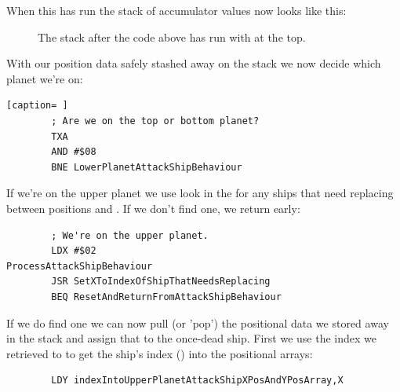 When this has run the stack of accumulator values now looks like this:

\begin{figure}[H]
  {
    \setlength{\tabcolsep}{3.0pt}
    \setlength\cmidrulewidth{\heavyrulewidth} %
    \begin{adjustbox}{width=10cm,center}
    \end{adjustbox}

  }\caption*{The stack after the code above has run with  at the top.}
\end{figure}

With our position data safely stashed away on the stack we now decide which planet we're on:

\begin{lstlisting}[caption= ]
        ; Are we on the top or bottom planet?
        TXA
        AND #$08
        BNE LowerPlanetAttackShipBehaviour
\end{lstlisting}

If we're on the upper planet we use  look in the  for any ships that
need replacing between positions  and . If we don't find one, we return early:

\begin{lstlisting}
        ; We're on the upper planet.
        LDX #$02
ProcessAttackShipBehaviour   
        JSR SetXToIndexOfShipThatNeedsReplacing
        BEQ ResetAndReturnFromAttackShipBehaviour
\end{lstlisting}

If we do find one we can now pull (or 'pop') the positional data we stored away in the stack and assign that to the once-dead
ship. First we use the index we retrieved to  to get the ship's index () into the positional arrays:

\begin{lstlisting}
        LDY indexIntoUpperPlanetAttackShipXPosAndYPosArray,X
\end{lstlisting}

